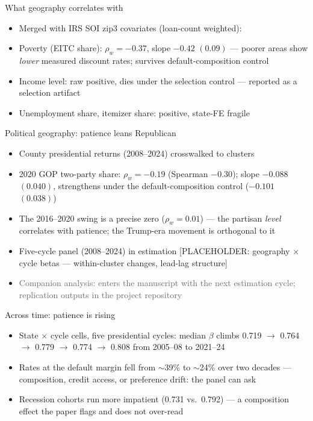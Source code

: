 \documentclass[11pt,aspectratio=169]{beamer}
\newenvironment{wideitemize}{\begin{itemize}\setlength{\itemsep}{0.7em}}{\end{itemize}}
\newcommand{\ph}[1]{\alert{[PLACEHOLDER: #1]}}
\begin{document}
\begin{frame}{What geography correlates with}
\begin{wideitemize}
  \item Merged with IRS SOI zip3 covariates (loan-count weighted):
  \item \alert{Poverty (EITC share): $\rho_w = -0.37$}, slope $-0.42$
        $(0.09)$ --- poorer areas show \emph{lower} measured discount rates;
        survives default-composition control
  \item Income level: raw positive, \alert{dies under the selection control}
        --- reported as a selection artifact
  \item Unemployment share, itemizer share: positive, state-FE fragile
\end{wideitemize}
\end{frame}

\begin{frame}{Political geography: patience leans Republican}
\begin{wideitemize}
  \item County presidential returns (2008--2024) crosswalked to clusters
  \item 2020 GOP two-party share: $\rho_w = -0.19$ (Spearman $-0.30$);
        slope $-0.088$ $(0.040)$, \alert{strengthens} under the
        default-composition control ($-0.101$ $(0.038)$)
  \item The 2016--2020 \alert{swing is a precise zero} ($\rho_w = 0.01$) ---
        the partisan \emph{level} correlates with patience; the Trump-era
        movement is orthogonal to it
  \item Five-cycle panel (2008--2024) in estimation \ph{geography $\times$
        cycle betas --- within-cluster changes, lead-lag structure}
  \item \textcolor{dimgray}{\footnotesize Companion analysis: enters the
        manuscript with the next estimation cycle; replication outputs in
        the project repository}
\end{wideitemize}
\end{frame}

\begin{frame}{Across time: patience is rising}
\begin{wideitemize}
  \item State $\times$ cycle cells, five presidential cycles: median
        $\beta$ climbs \alert{0.719 $\to$ 0.764 $\to$ 0.779 $\to$ 0.774
        $\to$ 0.808} from 2005--08 to 2021--24
  \item Rates at the default margin fell from $\sim$39\% to $\sim$24\%
        over two decades --- composition, credit access, or preference
        drift: the panel can ask
  \item Recession cohorts run more impatient (0.731 vs.\ 0.792) ---
        a composition effect the paper flags and does not over-read
\end{wideitemize}
\end{frame}
\end{document}

